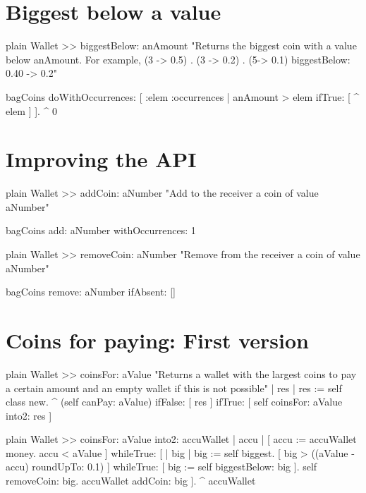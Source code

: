 \documentclass[10pt,twoside,english]{_support/latex/sbabook/sbabook}
\begin{document}
\section{Biggest below a value}
\begin{displaycode}{plain}
Wallet >> biggestBelow: anAmount
	"Returns the biggest coin with a value below anAmount. For example, {(3 -> 0.5) . (3 -> 0.2) . (5-> 0.1)} biggestBelow: 0.40 -> 0.2"
	
	bagCoins doWithOccurrences: [ :elem :occurrences |
			anAmount > elem ifTrue: [ ^ elem ] ].
	^ 0
\end{displaycode}
\section{Improving the API}
\begin{displaycode}{plain}
Wallet >> addCoin: aNumber
	"Add to the receiver a coin of value aNumber"
	
	bagCoins add: aNumber withOccurrences: 1 
\end{displaycode}

\begin{displaycode}{plain}
Wallet >> removeCoin: aNumber
	"Remove from the receiver a coin of value aNumber"
	
	bagCoins remove: aNumber ifAbsent: [] 
\end{displaycode}
\section{Coins for paying: First version}
\begin{displaycode}{plain}
Wallet >> coinsFor: aValue
	"Returns a wallet with the largest coins to pay a certain amount and an empty wallet if this is not possible"
	| res |
	res := self class new.
	^ (self canPay: aValue)
		ifFalse: [ res ]
		ifTrue: [ self coinsFor: aValue into2: res ] 
\end{displaycode}

\begin{displaycode}{plain}
Wallet >> coinsFor: aValue into2: accuWallet
	| accu |
	[ accu := accuWallet money.
	accu < aValue ]
		whileTrue: [
			| big |
			big := self biggest.
			[ big > ((aValue - accu) roundUpTo: 0.1) ] 
				whileTrue: [ big := self biggestBelow: big ].
			self removeCoin: big.
			accuWallet addCoin: big ].
	^ accuWallet 
\end{displaycode}


\backmatter



\end{document}
